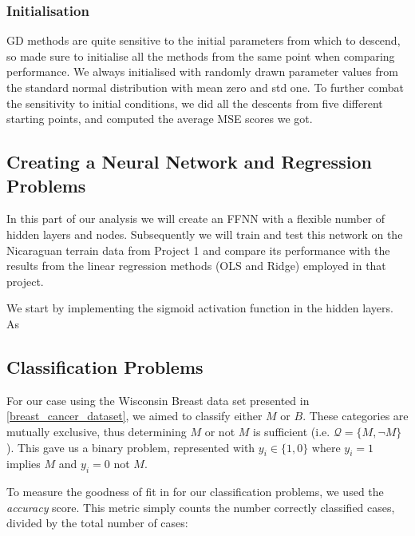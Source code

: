     \subsubsection{Initialisation}
        GD methods are quite sensitive to the initial parameters from which to descend, so made sure to initialise all the methods from the same point when comparing performance. We always initialised with randomly drawn parameter values from the standard normal distribution with mean zero and std one. To further combat the sensitivity to initial conditions, we did all the descents from five different starting points, and computed the average MSE scores we got.
        \\

\subsection{Creating a Neural Network and Regression Problems}
    In this part of our analysis we will create an FFNN with a flexible number of hidden layers and nodes. Subsequently we will train and test this network on the Nicaraguan terrain data from Project 1 and compare its performance with the results from the linear regression methods (OLS and Ridge) employed in that project. 


    We start by implementing the sigmoid activation function in the hidden layers. As 

    
\subsection{Classification Problems}
    For our case using the Wisconsin Breast data set presented in \cref{breast_cancer_dataset}, we aimed to classify either $M$ or $B$. These categories are mutually exclusive, thus determining $M$ or not $M$ is sufficient (i.e. $\mathcal{Q} = \{ M, \neg M \}$). This gave us a binary problem, represented with $y_i \in \{ 1, 0 \}$ where $y_i = 1$ implies $M$ and $y_i = 0$ not $M$.

    To measure the goodness of fit in for our classification problems, we used the \textit{accuracy} score. This metric simply counts the number correctly classified cases, divided by the total number of cases:

